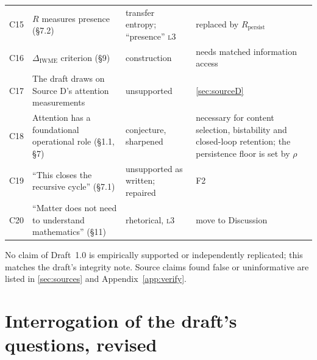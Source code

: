 \documentclass[11pt]{article}
\theoremstyle{definition}
\theoremstyle{remark}
\newcommand{\lvl}[1]{\textsc{l}#1}
\begin{document}
\begin{longtable}{@{}>{\raggedright\arraybackslash}p{0.75cm}>{\raggedright\arraybackslash}p{6.0cm}>{\raggedright\arraybackslash}p{4.2cm}>{\raggedright\arraybackslash}p{4.0cm}@{}}
C15 & $R$ measures presence (\S7.2) & transfer entropy; ``presence'' \lvl{3} & replaced by $R_{\mathrm{persist}}$ \\
C16 & $\Delta_{\mathrm{IWME}}$ criterion (\S9) & construction & needs matched information access \\
C17 & The draft draws on Source D's attention measurements & unsupported & \cref{sec:sourceD} \\
C18 & Attention has a foundational operational role (\S1.1, \S7) & conjecture, sharpened & necessary for content selection, bistability and closed-loop retention; the persistence floor is set by $\rho$ \\
C19 & ``This closes the recursive cycle'' (\S7.1) & unsupported as written; repaired & F2 \\
C20 & ``Matter does not need to understand mathematics'' (\S11) & rhetorical, \lvl{3} & move to Discussion \\
\bottomrule
\end{longtable}
No claim of Draft~1.0 is empirically supported or independently replicated; this matches the draft's integrity note. Source claims found false or uninformative are listed in \cref{sec:sources} and Appendix~\ref{app:verify}.

\section{Interrogation of the draft's questions, revised}
\end{document}
